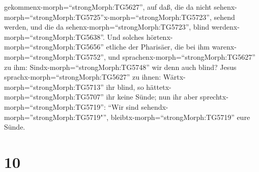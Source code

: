 gekommenx-morph=``strongMorph:TG5627'', auf daß, die da nicht
sehenx-morph=``strongMorph:TG5725''x-morph=``strongMorph:TG5723'',
sehend werden, und die da sehenx-morph=``strongMorph:TG5723'', blind
werdenx-morph=``strongMorph:TG5638''.  Und solches
hörtenx-morph=``strongMorph:TG5656'' etliche der Pharisäer, die bei ihm
warenx-morph=``strongMorph:TG5752'', und
sprachenx-morph=``strongMorph:TG5627'' zu ihm:
Sindx-morph=``strongMorph:TG5748'' wir denn auch blind? 
Jesus sprachx-morph=``strongMorph:TG5627'' zu ihnen:
Wärtx-morph=``strongMorph:TG5713'' ihr blind, so
hättetx-morph=``strongMorph:TG5707'' ihr keine Sünde; nun ihr aber
sprechtx-morph=``strongMorph:TG5719'': ``Wir sind
sehendx-morph=''strongMorph:TG5719"'',
bleibtx-morph=``strongMorph:TG5719'' eure Sünde.

\hypertarget{section-9}{%
\section{10}\label{section-9}}

